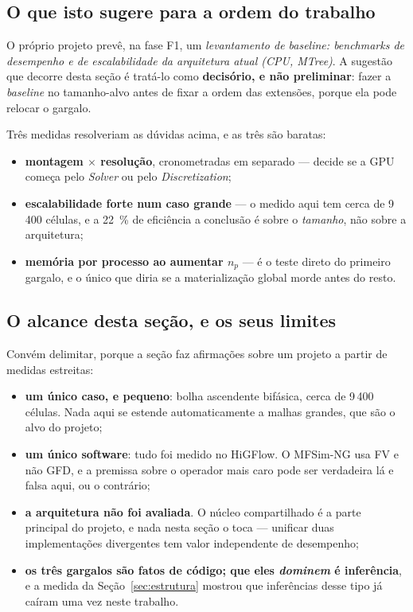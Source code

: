 \subsection{O que isto sugere para a ordem do trabalho}

O pr\'oprio projeto prev\^e, na fase F1, um \emph{levantamento de
\emph{baseline}: \emph{benchmarks} de desempenho e de escalabilidade da
arquitetura atual (CPU, MTree)}. A sugest\~ao que decorre desta se\c{c}\~ao \'e
trat\'a-lo como \textbf{decis\'orio, e n\~ao preliminar}: fazer a
\emph{baseline} no tamanho-alvo antes de fixar a ordem das extens\~oes, porque
ela pode relocar o gargalo.

Tr\^es medidas resolveriam as d\'uvidas acima, e as tr\^es s\~ao baratas:

\begin{itemize}
  \item \textbf{montagem $\times$ resolu\c{c}\~ao}, cronometradas em separado ---
    decide se a GPU come\c{c}a pelo \emph{Solver} ou pelo \emph{Discretization};
  \item \textbf{escalabilidade forte num caso grande} --- o medido aqui tem cerca
    de 9\,400 c\'elulas, e a \SI{22}{\percent} de efici\^encia a conclus\~ao \'e
    sobre o \emph{tamanho}, n\~ao sobre a arquitetura;
  \item \textbf{mem\'oria por processo ao aumentar $n_p$} --- \'e o teste direto do
    primeiro gargalo, e o \'unico que diria se a materializa\c{c}\~ao global morde
    antes do resto.
\end{itemize}

\subsection{O alcance desta se\c{c}\~ao, e os seus limites}

Convém delimitar, porque a se\c{c}\~ao faz afirma\c{c}\~oes sobre um projeto a
partir de medidas estreitas:

\begin{itemize}
  \item \textbf{um \'unico caso, e pequeno}: bolha ascendente bif\'asica, cerca de
    9\,400 c\'elulas. Nada aqui se estende automaticamente a malhas grandes, que
    s\~ao o alvo do projeto;
  \item \textbf{um \'unico software}: tudo foi medido no HiGFlow. O MFSim-NG usa
    FV e n\~ao GFD, e a premissa sobre o operador mais caro pode ser verdadeira
    l\'a e falsa aqui, ou o contr\'ario;
  \item \textbf{a arquitetura n\~ao foi avaliada}. O n\'ucleo compartilhado \'e a
    parte principal do projeto, e nada nesta se\c{c}\~ao o toca --- unificar duas
    implementa\c{c}\~oes divergentes tem valor independente de desempenho;
  \item \textbf{os tr\^es gargalos s\~ao fatos de c\'odigo; que eles
    \emph{dominem} \'e infer\^encia}, e a medida da Se\c{c}\~ao~\ref{sec:estrutura}
    mostrou que infer\^encias desse tipo j\'a caíram uma vez neste trabalho.
\end{itemize}
